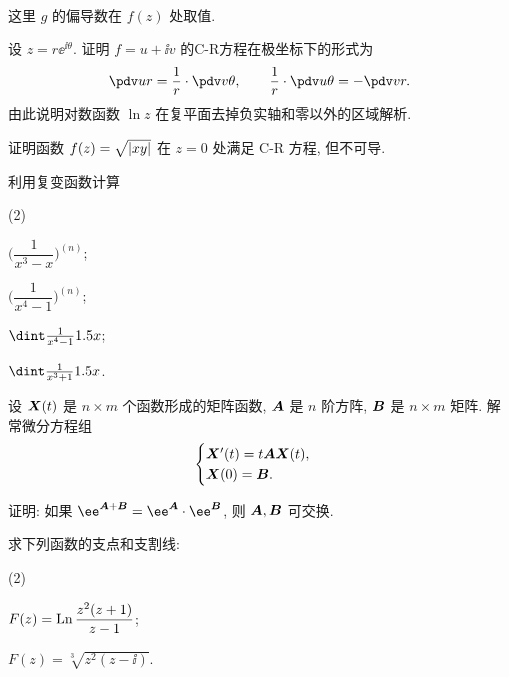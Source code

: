 \begin{homework}
\begin{homework}
\begin{align*}
    \end{align*}
    这里 $g$ 的偏导数在 $f(z)$ 处取值.
    \item 设 $z=r\ee^{\ii\theta}$. 证明 $f=u+\ii v$ 的C-R方程在极坐标下的形式为
    \[
      \pdv ur=\frac1r\cdot \pdv v\theta,\qquad
      \frac1r\cdot\pdv u\theta=-\pdv vr.
    \]
    由此说明对数函数 $\ln z$ 在复平面去掉负实轴和零以外的区域解析.
    \item 证明函数 $f(z)=\sqrt{\left|xy\right|}$ 在 $z=0$ 处满足 C-R 方程, 但不可导.
    \item \optionalex 利用复变函数计算
      \begin{subhomework}[after-item-skip=3pt](2)
        \item $\biggl(\dfrac1{x^3-x}\biggr)^{(n)}$;
        \item $\biggl(\dfrac1{x^4-1}\biggr)^{(n)}$;
        \item $\dint \frac1{x^4-1}\d x$;
        \item $\dint \frac1{x^3+1}\d x$.
      \end{subhomework}
    \item \optionalex 设 ${\boldsymbol{X}}(t)$ 是 $n\times m$ 个函数形成的矩阵函数, ${\boldsymbol{A}}$ 是 $n$ 阶方阵, ${\boldsymbol{B}}$ 是 $n\times m$ 矩阵. 解常微分方程组
      \[
        \begin{cases}
          {\boldsymbol{X}}'(t)=t{\boldsymbol{A}}{\boldsymbol{X}}(t),\\
          {\boldsymbol{X}}(0)={\boldsymbol{B}}.
        \end{cases}
      \]
    \item \optionalex 证明: 如果 $\ee^{\bfA+\bfB}=\ee^\bfA\cdot \ee^\bfB$, 则 ${\boldsymbol{A}},{\boldsymbol{B}}$ 可交换.
    \item \optionalex 求下列函数的支点和支割线:
      \begin{subhomework}(2)
        \item $F(z)=\operatorname{Ln}\dfrac{z^2(z+1)}{z-1}$;
        \item $F(z)=\sqrt[3]{z^2(z-\ii)}$.
      \end{subhomework}
  \end{homework}
\end{homework}
  